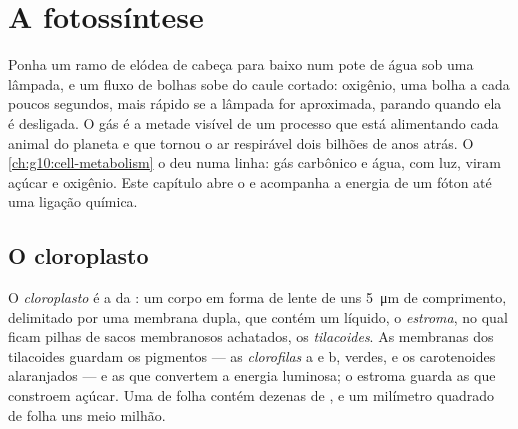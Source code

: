 \chapter{A fotossíntese}\label{ch:g12:photosynthesis}

Ponha um ramo de elódea de cabeça para baixo num pote de água sob uma
lâmpada, e um fluxo de bolhas sobe do caule cortado: oxigênio, uma
bolha a cada poucos segundos, mais rápido se a lâmpada for aproximada,
parando quando ela é desligada. O gás é a metade visível de um processo
que está alimentando cada animal do planeta e que tornou o ar
respirável dois bilhões de anos atrás. O \cref{ch:g10:cell-metabolism}
o deu numa linha: gás carbônico e água, com luz, viram açúcar e
oxigênio. Este capítulo abre o  e acompanha a energia de um
fóton até uma ligação química.

\section{O cloroplasto}

\begin{definition}[Cloroplasto]\label{def:g12:photosynthesis:chloroplast}
O \emph{cloroplasto} é a  da :
um corpo em forma de lente de uns \qty{5}{\micro m} de comprimento,
delimitado por uma membrana dupla, que contém um líquido, o
\emph{estroma}, no qual ficam pilhas de sacos membranosos achatados, os
\emph{tilacoides}. As membranas dos tilacoides guardam
os pigmentos --- as \emph{clorofilas} a e b, verdes, e os carotenoides
alaranjados --- e as  que convertem a energia luminosa; o
estroma guarda as  que constroem açúcar. Uma  de folha
contém dezenas de , e um milímetro quadrado de folha uns
meio milhão.
\end{definition}

